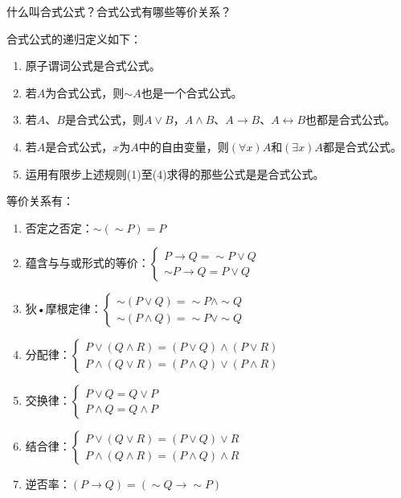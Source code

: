 \begin{question}
什么叫合式公式？合式公式有哪些等价关系？
\end{question}	
\begin{solution}
合式公式的递归定义如下：
	\begin{enumerate}
		\item 原子谓词公式是合式公式。
		\item 若$A$为合式公式，则$\sim A$也是一个合式公式。
		\item 若$A$、$B$是合式公式，则$A \vee B$，$A \wedge B$、$A \to B$、$A \leftrightarrow B$也都是合式公式。
		\item 若$A$是合式公式，$x$为$A$中的自由变量，则$\left(\forall x\right) A$和$\left(\exists x\right) A$都是合式公式。
		\item 运用有限步上述规则(1)至(4)求得的那些公式是是合式公式。
	\end{enumerate}
等价关系有：
	\begin{enumerate}
		\item 否定之否定：$\sim(\sim P)=P$
		\item 蕴含与与或形式的等价：$\begin{cases}
		P\to Q = \sim P \vee Q\\
		\sim P\to Q = P \vee Q
		\end{cases}$ 
		\item 狄•摩根定律：$\begin{cases}
		\sim (P \vee Q) = \sim P \wedge \sim Q \\
		\sim (P \wedge Q) = \sim P \vee \sim Q 
		\end{cases}$
		\item 分配律：$\begin{cases}
		P \vee (Q \wedge R) = (P \vee Q) \wedge (P \vee R) \\
		P \wedge (Q \vee R) = (P \wedge Q) \vee (P \wedge R)
		\end{cases}$
		\item 交换律：$\begin{cases}
		P \vee Q = Q \vee P \\
		P \wedge Q = Q \wedge P
		\end{cases}$
		\item 结合律：$\begin{cases}
		P \vee (Q \vee R) = (P \vee Q) \vee R \\
		P \wedge (Q \wedge R) = (P \wedge Q) \wedge R
		\end{cases}$
		\item 逆否率：$(P \to Q) = (\sim Q \to \sim P)$

\end{enumerate}
\end{solution}
